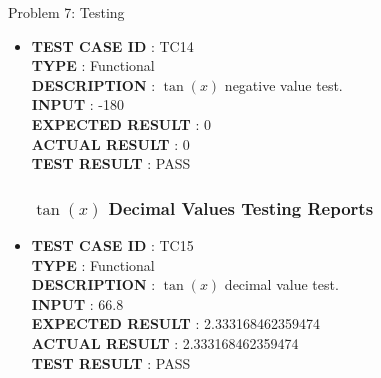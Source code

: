 \documentclass[a4paper,12pt]{article}
\begin{document}
\begin{section}{Problem 7: Testing}
\begin{itemize}
\item \textbf{TEST CASE ID} \hspace{1.25cm} : TC14 \\
\textbf{TYPE } \hspace{3.15cm}  : Functional\\
\textbf{DESCRIPTION }\hspace{1.25cm} : $\tan(x)$ negative value test. \\
\textbf{INPUT} \hspace{3.05cm} :  -180 \\
\textbf{EXPECTED RESULT} \hspace{0.01cm} : 0 \\
\textbf{ACTUAL RESULT} \hspace{0.6cm} : 0 \\
\textbf{TEST RESULT} \hspace{1.40cm} : PASS \\



\subsubsection{$\tan(x)$ Decimal Values Testing Reports}

\item \textbf{TEST CASE ID} \hspace{1.25cm} : TC15  \\
\textbf{TYPE } \hspace{3.15cm}  : Functional\\
\textbf{DESCRIPTION }\hspace{1.25cm} : $\tan(x)$ decimal value test. \\
\textbf{INPUT} \hspace{3.05cm} :  66.8 \\
\textbf{EXPECTED RESULT} \hspace{0.01cm} : 2.333168462359474 \\
\textbf{ACTUAL RESULT} \hspace{0.6cm} : 2.333168462359474  \\
\textbf{TEST RESULT} \hspace{1.40cm} : PASS \\


\end{itemize}
\end{section}
\end{document}
